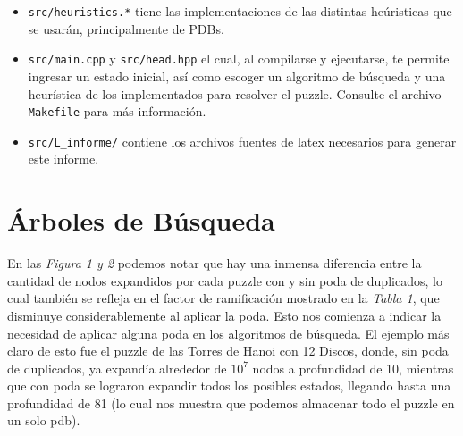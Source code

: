 \documentclass[a4paper,10pt]{article}
\begin{document}
\begin{itemize}
\begin{itemize}
      \item \verb|src/heuristics.*| tiene las implementaciones de las distintas 
      he\'uristicas que se usar\'an, principalmente de PDBs.

      \item \verb|src/main.cpp| y \verb|src/head.hpp| el cual, al compilarse y
      ejecutarse, te permite ingresar un estado inicial, as\'i como escoger un
      algoritmo de b\'usqueda y una heur\'istica de los implementados para resolver
      el puzzle. Consulte el archivo \verb|Makefile| para m\'as informaci\'on.
      
      \item \verb|src/L_informe/| contiene los archivos fuentes de latex necesarios 
      para generar este informe.
    \end{itemize}
    
  \end{itemize}

\section{\'Arboles de B\'usqueda}
    En las \textit{Figura 1 y 2} podemos notar que hay una inmensa diferencia entre la 
    cantidad de nodos expandidos por cada puzzle con y sin poda de duplicados, lo
    cual tambi\'en se refleja en el factor de ramificaci\'on mostrado en la 
    \textit{Tabla 1}, que disminuye considerablemente al aplicar la poda. Esto
    nos comienza a indicar la necesidad de aplicar alguna poda en los algoritmos 
    de b\'usqueda. El ejemplo m\'as claro de esto fue el puzzle de las Torres de 
    Hanoi con 12 Discos, donde, sin poda de duplicados, ya expand\'ia alrededor de 
    $10^7$ nodos a profundidad de 10, mientras que con poda se lograron expandir 
    todos los posibles estados, llegando hasta una profundidad de 81 (lo cual nos 
    muestra que podemos almacenar todo el puzzle en un solo pdb). \\
    
\end{document}
